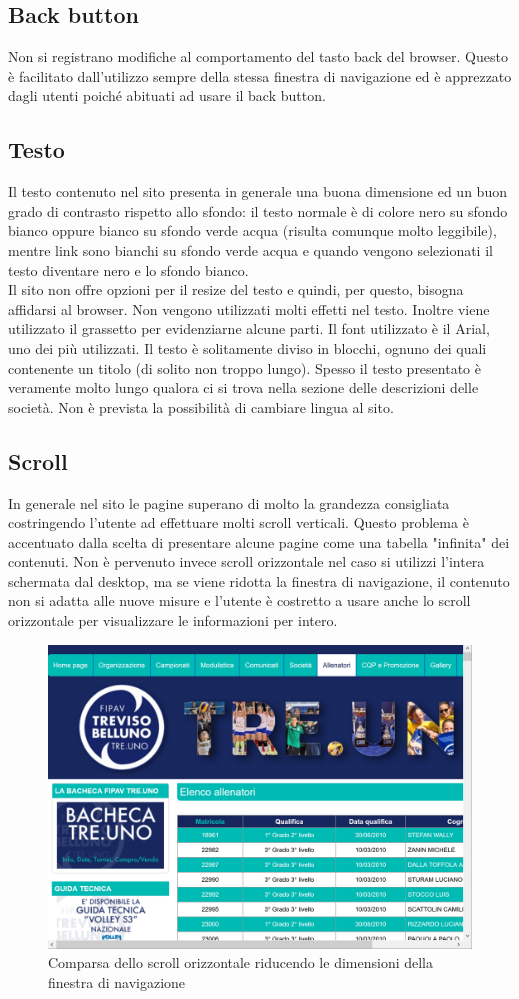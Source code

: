 	\subsection{Back button}
	Non si registrano modifiche al comportamento del tasto back del browser. Questo è
	facilitato dall'utilizzo sempre della stessa finestra di navigazione ed è
	apprezzato dagli utenti poiché abituati ad usare il back button.
	
	\subsection{Testo}
	Il testo contenuto nel sito presenta in generale una buona dimensione ed un buon 
	grado di contrasto rispetto allo sfondo: il testo normale è di colore nero su
	sfondo bianco oppure bianco su sfondo verde acqua (risulta comunque molto 
	leggibile), mentre link sono bianchi su sfondo verde acqua e quando vengono 
	selezionati il testo diventare nero e lo sfondo bianco. \\
	Il sito non offre opzioni per il resize del testo e quindi, per questo, bisogna
	affidarsi al browser. Non vengono utilizzati molti effetti nel testo. Inoltre
	viene utilizzato il grassetto per evidenziarne alcune parti. Il font utilizzato è
	il Arial, uno dei più utilizzati.
	Il testo è solitamente diviso in blocchi, ognuno dei quali contenente un
	titolo (di solito non troppo lungo). Spesso il testo presentato è veramente molto
	lungo qualora ci si trova nella sezione delle descrizioni delle società. Non è
	prevista la possibilità di cambiare lingua al sito.
	
	\subsection{Scroll}
	In generale nel sito le pagine superano di molto la grandezza consigliata
	costringendo l'utente ad effettuare molti scroll verticali. Questo problema è
	accentuato dalla scelta di presentare alcune pagine come una tabella "infinita"
	dei contenuti. Non è pervenuto invece scroll orizzontale nel caso si utilizzi 
	l'intera schermata dal desktop, ma se viene ridotta la finestra
	di navigazione, il contenuto non si adatta alle nuove misure e l'utente è 
	costretto a usare anche lo scroll orizzontale per visualizzare le informazioni 
	per intero.
	
	\begin{figure}[H]
	\centering
	\includegraphics[scale=0.7]{Images/finestraridotta.png}
	\caption{Comparsa dello scroll orizzontale riducendo le dimensioni della 
	finestra di navigazione}
	\end{figure}
	
	
	
	